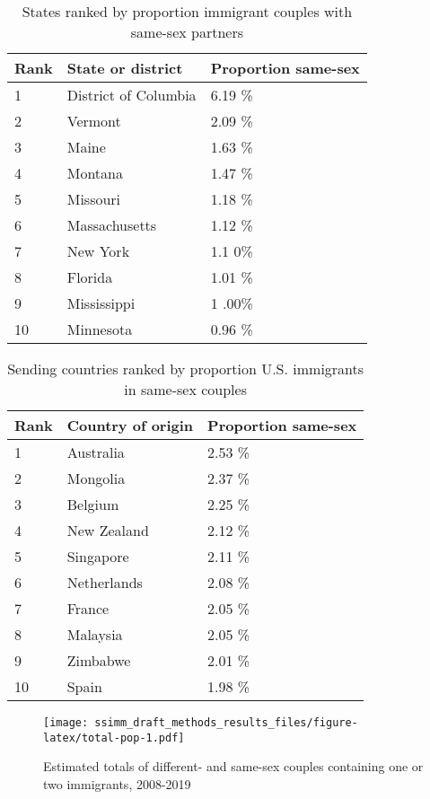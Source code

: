 \documentclass[11pt,]{article}
\begin{document}
\begin{table}

\caption{\label{tab:table-prop}States ranked by proportion immigrant couples with same-sex partners}
\centering
\begin{tabular}[t]{lll}
\toprule
Rank & State or district & Proportion same-sex\\
\midrule
1 & District of Columbia & 6.19 \%\\
2 & Vermont & 2.09 \%\\
3 & Maine & 1.63 \%\\
4 & Montana & 1.47 \%\\
5 & Missouri & 1.18 \%\\
6 & Massachusetts & 1.12 \%\\
7 & New York & 1.1 0\%\\
8 & Florida & 1.01 \%\\
9 & Mississippi & 1 .00\%\\
10 & Minnesota & 0.96 \%\\
\bottomrule
\end{tabular}
\end{table}

\begin{table}

\caption{\label{tab:country-tab}Sending countries ranked by proportion U.S. immigrants in same-sex couples}
\centering
\begin{tabular}[t]{lll}
\toprule
Rank & Country of origin & Proportion same-sex\\
\midrule
1 & Australia & 2.53 \%\\
2 & Mongolia & 2.37 \%\\
3 & Belgium & 2.25 \%\\
4 & New Zealand & 2.12 \%\\
5 & Singapore & 2.11 \%\\
6 & Netherlands & 2.08 \%\\
7 & France & 2.05 \%\\
8 & Malaysia & 2.05 \%\\
9 & Zimbabwe & 2.01 \%\\
10 & Spain & 1.98 \%\\
\bottomrule
\end{tabular}
\end{table}

\begin{figure}
\centering
\texttt{[image: ssimm\_draft\_methods\_results\_files/figure-latex/total-pop-1.pdf]}
\caption{\label{fig:total-pop}Estimated totals of different- and same-sex couples containing one or two immigrants, 2008-2019}
\end{figure}
\end{document}
